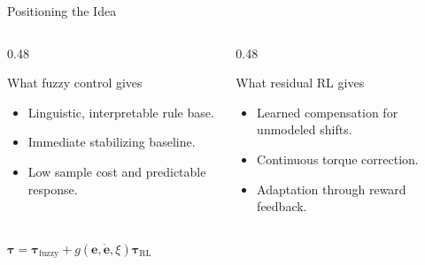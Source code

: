 \documentclass[aspectratio=169,10pt]{beamer}
\begin{document}
\begin{frame}{Positioning the Idea}
  \begin{columns}[T,onlytextwidth]
    \begin{column}{0.48\textwidth}
      \begin{block}{What fuzzy control gives}
        \begin{itemize}
          \item Linguistic, interpretable rule base.
          \item Immediate stabilizing baseline.
          \item Low sample cost and predictable response.
        \end{itemize}
      \end{block}
    \end{column}
    \begin{column}{0.48\textwidth}
      \begin{block}{What residual RL gives}
        \begin{itemize}
          \item Learned compensation for unmodeled shifts.
          \item Continuous torque correction.
          \item Adaptation through reward feedback.
        \end{itemize}
      \end{block}
    \end{column}
  \end{columns}
  \vfill
  \begin{center}
    \Large $\bm{\tau}=\bm{\tau}_{\mathrm{fuzzy}}+g(\bm{e},\dot{\bm{e}},\xi)\bm{\tau}_{\mathrm{RL}}$
  \end{center}
\end{frame}
\end{document}
